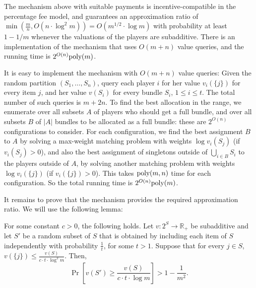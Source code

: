 \documentclass{theoretics}
\newcommand{\R}{\mathbb{R}}
\newcommand{\poly}{\hbox{poly}}
\begin{document}
\begin{theorem}
The mechanism above with suitable payments is incentive-compatible in the percentage fee model, and guarantees an approximation ratio of $\min(\frac m n, O(n\cdot \log^2m)) = O({m}^{1/2} \cdot \log m)$ with probability at least $1-1/m$ whenever the valuations of the players are subadditive. There is an implementation of the mechanism that uses $O(m+n)$ value queries, and the running time is $2^{O(n)} \poly(m)$.
\end{theorem}

It is easy to implement the mechanism with $O(m+n)$ value queries: Given the random partition $(S_1,\ldots,S_n)$, query each player $i$ for her value $v_i(\{j\})$ for every item $j$, and her value $v(S_i)$ for every bundle $S_i$, $1\leq i\leq t$. The total number of such queries is $m+2n$. To find the best allocation in the range, we enumerate over all subsets $A$ of players who should get a full bundle, and over all subsets $B$ of $|A|$ bundles to be allocated as a full bundle: these are $2^{O(n)}$ configurations to consider. For each configuration, we find the best assignment $B$ to $A$ by solving a max-weight matching problem with weights $\log v_i(S_j)$ (if $v_i(S_j)>0$), and also the best assignment of singletons outside of $\bigcup_{i \in B} S_i$ to the players outside of $A$, by solving another matching problem with weights $\log v_i(\{j\})$ (if $v_i(\{j\})>0$). This takes $\poly(m,n)$ time for each configuration. So the total running time is $2^{O(n)} \poly(m)$. 




It remains to prove that the mechanism provides the required approximation ratio. We will use the following lemma:

\begin{lemma}\label{lemma:subadditive-lower-tail}
For some constant $c>0$, the following holds. Let $v:2^S \to \R_+$ be subadditive and let $S'$ be a random subset of $S$ that is obtained by including each item of $S$ independently with probability $\frac 1 t$, for some $t>1$. Suppose that for every  $j \in S$, $v(\{j\}) \leq \frac {v(S)} {c\cdot t\cdot \log^2 m}$. Then, 
$$\Pr\left[v(S') \geq \frac {v(S)} {c\cdot t\cdot \log m} \right] > 1 - \frac{1}{m^2}.$$
\end{lemma}
\end{document}

